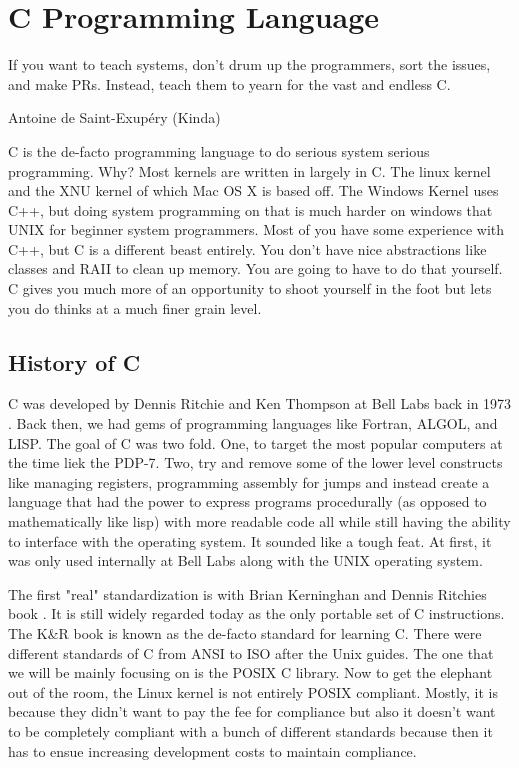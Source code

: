 \chapter{C Programming Language}

\epigraph{If you want to teach systems, don't drum up the programmers, sort the issues, and make PRs. Instead, teach them to yearn for the vast and endless C.}{Antoine de Saint-Exup\'{e}ry (Kinda)}

\gls{C} is the de-facto programming language to do serious system serious programming. Why? Most kernels are written in largely in C. The \gls{linux kernel} \cite{Love} and the XNU kernel \citet{xnukernel} of which Mac OS X is based off. The Windows Kernel uses C++, but doing system programming on that is much harder on windows that UNIX for beginner system programmers. Most of you have some experience with C++, but C is a different beast entirely. You don't have nice abstractions like classes and RAII to clean up memory. You are going to have to do that yourself. C gives you much more of an opportunity to shoot yourself in the foot but lets you do thinks at a much finer grain level.

\section{History of C}

C was developed by Dennis Ritchie and Ken Thompson at Bell Labs back in 1973 \cite{Ritchie:1993:DCL:155360.155580}. Back then, we had gems of programming languages like Fortran, ALGOL, and LISP. The goal of C was two fold. One, to target the most popular computers at the time liek the PDP-7. Two, try and remove some of the lower level constructs like managing registers, programming assembly for jumps and instead create a language that had the power to express programs procedurally (as opposed to mathematically like lisp) with more readable code all while still having the ability to interface with the operating system. It sounded like a tough feat. At first, it was only used internally at Bell Labs along with the UNIX operating system. 

The first "real" standardization is with Brian Kerninghan and Dennis Ritchies book \cite{kernighan1988c}. It is still widely regarded today as the only \gls{portable} set of C instructions. The K\&R book is known as the de-facto standard for learning C.  There were different standards of C from ANSI to ISO after the Unix guides. The one that we will be mainly focusing on is the \gls{POSIX} C library. Now to get the elephant out of the room, the Linux kernel is not entirely POSIX compliant. Mostly, it is because they didn't want to pay the fee for compliance but also it doesn't want to be completely compliant with a bunch of different standards because then it has to ensue increasing development costs to maintain compliance.

